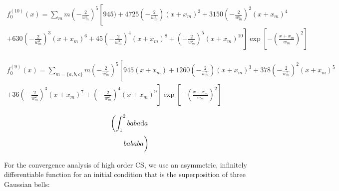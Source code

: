 \documentclass[11pt]{article}
\begin{document}
\begin{equation}
\begin{split}
f^{(10)}_0(x)  =  \sum_{m} m\left(-\frac{2}{w_m^2}\right)^5 \left[ 945) + 4725 \left(-\frac{2}{w_m^2}\right) (x + x_m)^2 + 3150\left(-\frac{2}{w_m^2}\right)^2 (x + x_m)^4 \right. \\
\left. + 630\left(-\frac{2}{w_m^2}\right)^3 (x + x_m)^6 + 45 \left(-\frac{2}{w_m^2}\right)^4 (x + x_m)^8 +  \left(-\frac{2}{w_m^2}\right)^5 (x + x_m)^{10}\right]\exp\left[-\left(\frac{x + x_m}{w_m}\right)^2\right]
\end{split}
\end{equation}


\begin{equation}
\begin{split}
f^{(9)}_0(x)  =  \sum_{m = \{a,b,c\}} m\left(-\frac{2}{w_m^2}\right)^5 \left[ 945(x + x_m) + 1260 \left(-\frac{2}{w_m^2}\right) (x + x_m)^3 + 378\left(-\frac{2}{w_m^2}\right)^2 (x + x_m)^5 \right. \\
\left. + 36\left(-\frac{2}{w_m^2}\right)^3 (x + x_m)^7 + \left(-\frac{2}{w_m^2}\right)^4 (x + x_m)^9\right]\exp\left[-\left(\frac{x + x_m}{w_m}\right)^2\right]
\end{split}
\end{equation}


\begin{equation}
    \begin{split}
    \left( \int_1^2 ba ba \mathrm da \right. \\
    \left. ba ba ba \vphantom{\int_1^2} \right)
    \end{split}
\end{equation}














For the convergence analysis of high order CS, we use an asymmetric, infinitely differentiable function for an initial condition that is the superposition of three Gaussian bells:
\end{document}
